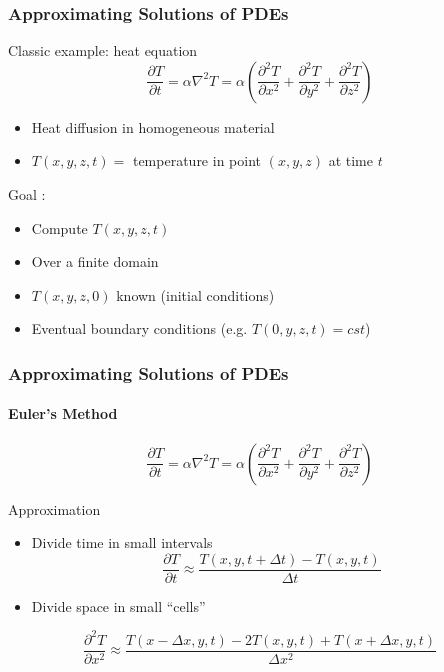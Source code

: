 \documentclass[xcolor={rgb,x11names,svgnames},rgb,x11names,svgnames]{beamer}
\begin{document}
\begin{frame}
\frametitle{Approximating Solutions of PDEs}

\begin{block}{Classic example: heat equation}
  \[
    \frac{\partial T}{\partial t} = \alpha \nabla^2 T = \alpha \left( \frac{\partial^2 T}{\partial x^2} + \frac{\partial^2 T}{\partial y^2} + \frac{\partial^2 T}{\partial z^2}\right)
  \]
  
  \begin{itemize}
  \item Heat diffusion in homogeneous material
  \item $T(x,y,z,t) = $ temperature in point $(x,y,z)$ at time $t$
  \end{itemize}
\end{block}

\medskip
\begin{alertblock}{Goal :}
\begin{itemize}
\item Compute $T(x, y, z, t)$
\item Over a finite domain
\item $T(x, y, z, 0)$ known (initial conditions)
\item Eventual boundary conditions (e.g. $T(0, y, z, t) = cst$)
\end{itemize}
\end{alertblock}
\end{frame}


\begin{frame}
\frametitle{Approximating Solutions of PDEs}
\framesubtitle{Euler's Method}

  \[
    \frac{\partial T}{\partial t} = \alpha \nabla^2 T = \alpha \left( \frac{\partial^2 T}{\partial x^2} + \frac{\partial^2 T}{\partial y^2} + \frac{\partial^2 T}{\partial z^2}\right)
  \]

  \begin{exampleblock}{Approximation}
    \begin{itemize}
    \item Divide time in small intervals
      \[
        \frac{\partial T}{\partial t} \approx \frac{T(x,y, t + \Delta t) - T(x,y, t)}{\Delta t}
      \]
    \item Divide space in small ``cells''
    \end{itemize}
    \[
      \frac{\partial^2 T}{\partial x^2} \approx \frac{T(x - \Delta x,y,t) - 2 T(x,y,t) + T(x + \Delta x,y,t)}{ \Delta x^2 }
    \]
  \end{exampleblock}
\end{frame}
\end{document}
